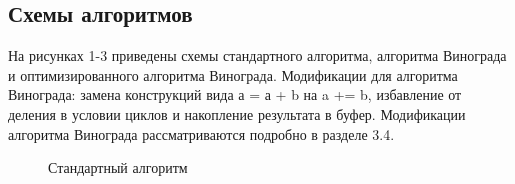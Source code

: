 \documentclass[a4paper, 14pt]{article}
\begin{document}
        \subsection{Схемы алгоритмов}
        На рисунках 1-3 приведены схемы стандартного алгоритма, алгоритма Винограда и оптимизированного алгоритма Винограда. Модификации для алгоритма Винограда: замена конструкций вида а = а + b на a += b, избавление от деления в условии циклов и накопление результата в буфер.  Модификации алгоритма Винограда рассматриваются подробно в разделе 3.4.\\
    	\begin{figure}[h]
        	\caption{Стандартный алгоритм}
        	\label{fig:schema_standart}
        \end{figure}
        \newpage
\end{document}
